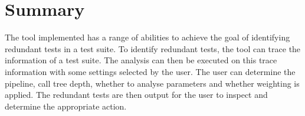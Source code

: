\section{Summary}

The tool implemented has a range of abilities to achieve the goal of identifying redundant tests in a test suite. To identify redundant tests, the tool can trace the information of a test suite. The analysis can then be executed on this trace information with some settings selected by the user. The user can determine the pipeline, call tree depth, whether to analyse parameters and whether weighting is applied. The redundant tests are then output for the user to inspect and determine the appropriate action. 